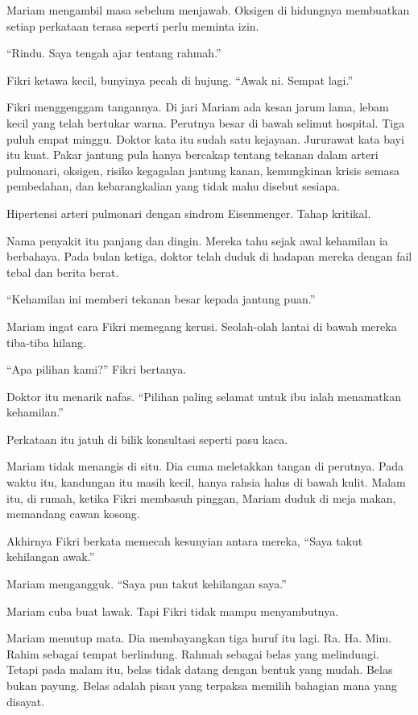 \documentclass[
  11pt,
  a5paper,
  openany,
  oneside]{book}
\begin{document}
Mariam mengambil masa sebelum menjawab. Oksigen di hidungnya membuatkan
setiap perkataan terasa seperti perlu meminta izin.

``Rindu. Saya tengah ajar tentang rahmah.''

Fikri ketawa kecil, bunyinya pecah di hujung. ``Awak ni. Sempat lagi.''

Fikri menggenggam tangannya. Di jari Mariam ada kesan jarum lama, lebam
kecil yang telah bertukar warna. Perutnya besar di bawah selimut
hospital. Tiga puluh empat minggu. Doktor kata itu sudah satu kejayaan.
Jururawat kata bayi itu kuat. Pakar jantung pula hanya bercakap tentang
tekanan dalam arteri pulmonari, oksigen, risiko kegagalan jantung kanan,
kemungkinan krisis semasa pembedahan, dan kebarangkalian yang tidak mahu
disebut sesiapa.

Hipertensi arteri pulmonari dengan sindrom Eisenmenger. Tahap kritikal.

Nama penyakit itu panjang dan dingin. Mereka tahu sejak awal kehamilan
ia berbahaya. Pada bulan ketiga, doktor telah duduk di hadapan mereka
dengan fail tebal dan berita berat.

``Kehamilan ini memberi tekanan besar kepada jantung puan.''

Mariam ingat cara Fikri memegang kerusi. Seolah-olah lantai di bawah
mereka tiba-tiba hilang.

``Apa pilihan kami?'' Fikri bertanya.

Doktor itu menarik nafas. ``Pilihan paling selamat untuk ibu ialah
menamatkan kehamilan.''

Perkataan itu jatuh di bilik konsultasi seperti pasu kaca.

Mariam tidak menangis di situ. Dia cuma meletakkan tangan di perutnya.
Pada waktu itu, kandungan itu masih kecil, hanya rahsia halus di bawah
kulit. Malam itu, di rumah, ketika Fikri membasuh pinggan, Mariam duduk
di meja makan, memandang cawan kosong.

Akhirnya Fikri berkata memecah kesunyian antara mereka, ``Saya takut
kehilangan awak.''

Mariam mengangguk. ``Saya pun takut kehilangan saya.''

Mariam cuba buat lawak. Tapi Fikri tidak mampu menyambutnya.

Mariam menutup mata. Dia membayangkan tiga huruf itu lagi. Ra. Ha. Mim.
Rahim sebagai tempat berlindung. Rahmah sebagai belas yang melindungi.
Tetapi pada malam itu, belas tidak datang dengan bentuk yang mudah.
Belas bukan payung. Belas adalah pisau yang terpaksa memilih bahagian
mana yang disayat.
\end{document}
